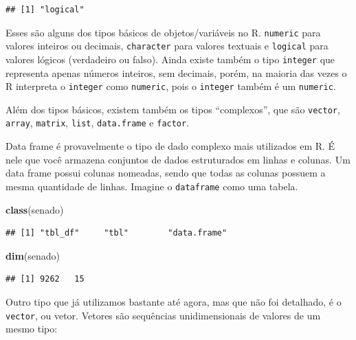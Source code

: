 \documentclass[]{book}
\newenvironment{Shaded}{\begin{snugshade}}{\end{snugshade}}
\newcommand{\KeywordTok}[1]{\textcolor[rgb]{0.13,0.29,0.53}{\textbf{#1}}}
\newcommand{\NormalTok}[1]{#1}
\begin{document}
\begin{verbatim}
## [1] "logical"
\end{verbatim}

Esses são alguns dos tipos básicos de objetos/variáveis no R.
\texttt{numeric} para valores inteiros ou decimais, \texttt{character}
para valores textuais e \texttt{logical} para valores lógicos
(verdadeiro ou falso). Ainda existe também o tipo \texttt{integer} que
representa apenas números inteiros, sem decimais, porém, na maioria das
vezes o R interpreta o \texttt{integer} como \texttt{numeric}, pois o
\texttt{integer} também é um \texttt{numeric}.

Além dos tipos básicos, existem também os tipos ``complexos'', que são
\texttt{vector}, \texttt{array}, \texttt{matrix}, \texttt{list},
\texttt{data.frame} e \texttt{factor}.

Data frame é provavelmente o tipo de dado complexo mais utilizados em R.
É nele que você armazena conjuntos de dados estruturados em linhas e
colunas. Um data frame possui colunas nomeadas, sendo que todas as
colunas possuem a mesma quantidade de linhas. Imagine o
\texttt{dataframe} como uma tabela.

\begin{Shaded}
\begin{Highlighting}[]
\KeywordTok{class}\NormalTok{(senado)}
\end{Highlighting}
\end{Shaded}

\begin{verbatim}
## [1] "tbl_df"     "tbl"        "data.frame"
\end{verbatim}

\begin{Shaded}
\begin{Highlighting}[]
\KeywordTok{dim}\NormalTok{(senado)}
\end{Highlighting}
\end{Shaded}

\begin{verbatim}
## [1] 9262   15
\end{verbatim}

Outro tipo que já utilizamos bastante até agora, mas que não foi
detalhado, é o \texttt{vector}, ou vetor. Vetores são sequências
unidimensionais de valores de um mesmo tipo:
\end{document}
